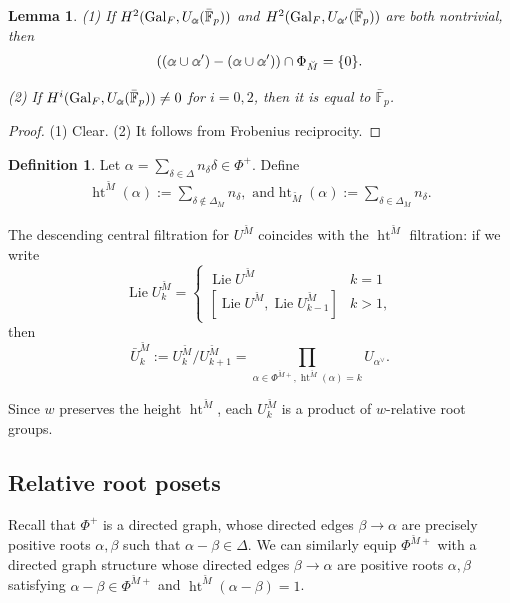 \documentclass[11pt]{amsart}
\newcommand{\MINOREDITED}[1]{#1}
\newtheorem{lem}[thm]{Lemma}
\theoremstyle{definition}
\newtheorem{defn}[thm]{Definition}
\newcommand{\doublestroke}[1]{\pdfliteral{1 Tr .3 w}#1\pdfliteral{0 Tr 0 w}}
\newcommand{\Balpha}{\doublestroke{\alpha}}
\newcommand{\bFp}{\bar{\mathbb{F}}_p}
\newcommand{\bM}{\breve{M}}
\DeclareMathOperator{\Ht}{ht}
\DeclareMathOperator{\Lie}{Lie}
\DeclareMathOperator{\Gal}{Gal}
\begin{document}
\begin{lem}
\rm
(1) If $H^2(\Gal_F, U_{\Balpha}(\bFp))$
and $H^2(\Gal_F, U_{\Balpha'}(\bFp))$
are both nontrivial,
then
\[
((\Balpha\cup\Balpha')-(\Balpha\cup\Balpha'))
\cap \Phi_{\bM}=\{0\}.
\]

(2) If $H^i(\Gal_F, U_{\Balpha}(\bFp))\neq 0$
for $i=0,2$,
then it is equal to $\bFp$.
\end{lem}

\begin{proof}
(1) Clear.
(2) It follows from Frobenius reciprocity.
\end{proof}


\begin{defn}
Let $\alpha=\sum_{\delta\in \Delta}n_\delta\delta\in \Phi^+$.
Define
\begin{align*}
\Ht^{\bM}(\alpha)
:=\sum_{\delta\not\in \Delta_{\bM}}n_\delta,\text{~and}
\Ht_{\bM}(\alpha)
:=\sum_{\delta\in \Delta_{\bM}}n_\delta.
\end{align*}
\end{defn}

The descending central filtration for $U^{\bM}$
coincides with the $\Ht^{\bM}$ filtration:
if we write
\[
\Lie U^{\bM}_k
=
\begin{cases}
\Lie U^{\bM} & k=1 \\
[\Lie U^{\bM},\Lie U^{\bM}_{k-1}] & k>1,
\end{cases}
\]
then
\[
\bar U^{\bM}_k:=U^{\bM}_k/U^{\bM}_{\MINOREDITED{k+1}}
=\prod_{\alpha\in \MINOREDITED{\Phi^{\bM+}}, \Ht^{\bM}(\alpha)=k}
U_{\alpha^{\vee}}.
\]




Since $w$ preserves the height $\Ht^{\bM}$,
each $U^{\bM}_{k}$
is a product
of $w$-relative root groups.


\subsection{Relative root posets}
Recall that $\Phi^+$
is a directed graph,
whose directed edges $\beta\to \alpha$
are precisely positive roots
$\alpha, \beta$ such that $\alpha-\beta\in \Delta$.
We can similarly equip $\Phi^{\bM+}$
with a directed graph structure
whose directed edges
$\beta\to \alpha$
are positive roots $\alpha, \beta$
satisfying $\alpha-\beta\in \Phi^{\bM+}$
and $\Ht^{\bM}(\alpha-\beta)=1$.
\end{document}
